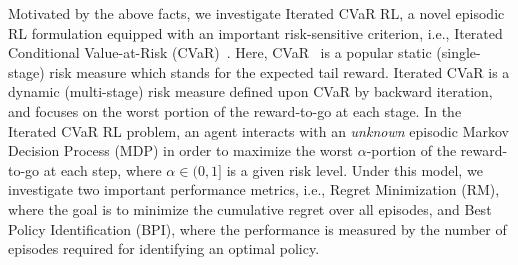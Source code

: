 \documentclass{article} %
\newcommand{\longbo}[1]{}
\newcommand{\yihan}[1]{}
\newcommand{\longbo}[1]{{\color{red}  [\text{Longbo:} #1]}}
\newcommand{\yihan}[1]{{\color{teal} [\text{Yihan:} #1]}}
\begin{document}
	
	Motivated by the above facts, we investigate Iterated CVaR RL, a novel episodic RL formulation equipped with an important risk-sensitive criterion, i.e., Iterated Conditional Value-at-Risk (CVaR)~\citep{hardy2004iterated}. 
	Here, CVaR~\citep{artzner1999coherent} is a popular static (single-stage) risk measure which stands for the expected tail reward. 
	Iterated CVaR is a dynamic (multi-stage) risk measure defined upon CVaR by backward iteration, and
	focuses on the worst portion of the reward-to-go at each stage. 
	In the Iterated CVaR RL problem, an agent interacts with an \emph{unknown} episodic Markov Decision Process (MDP) in order to maximize the worst $\alpha$-portion of the reward-to-go 
	at each step, where $\alpha \in (0,1]$ is a given risk level.
	Under this model, we investigate two important performance metrics,
	i.e., Regret Minimization (RM), where the goal is to minimize the cumulative regret over all episodes,  and Best Policy Identification (BPI), where the performance is measured by the number of episodes required for identifying an optimal policy. 
	
	
	
\end{document}
